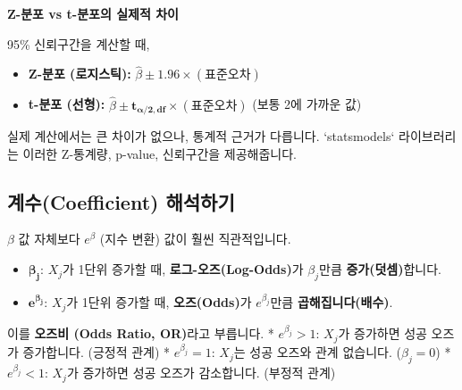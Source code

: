 \documentclass[11pt,a4paper]{book}
\theoremstyle{definition}
\begin{document}
\begin{examplebox}
  \textbf{Z-분포 vs t-분포의 실제적 차이}

  95\% 신뢰구간을 계산할 때,
  \begin{itemize}
    \item \textbf{Z-분포 (로지스틱):} $\hat{\beta} \pm \mathbf{1.96} \times (\text{표준오차})$
    \item \textbf{t-분포 (선형):} $\hat{\beta} \pm \mathbf{t_{\alpha/2, df}} \times (\text{표준오차})$ (보통 2에 가까운 값)
  \end{itemize}
  실제 계산에서는 큰 차이가 없으나, 통계적 근거가 다릅니다.
  `statsmodels` 라이브러리는 이러한 Z-통계량, p-value, 신뢰구간을 제공해줍니다.
\end{examplebox}

\subsection{계수(Coefficient) 해석하기}

$\beta$ 값 자체보다 $e^{\beta}$ (지수 변환) 값이 훨씬 직관적입니다.

\begin{itemize}
  \item $\boldsymbol{\beta_j}$: $X_j$가 1단위 증가할 때, \textbf{로그-오즈(Log-Odds)}가 $\beta_j$만큼 \textbf{증가(덧셈)}합니다.
  \item $\boldsymbol{e^{\beta_j}}$: $X_j$가 1단위 증가할 때, \textbf{오즈(Odds)}가 $e^{\beta_j}$만큼 \textbf{곱해집니다(배수)}.
\end{itemize}

이를 \textbf{오즈비 (Odds Ratio, OR)}라고 부릅니다.
* $e^{\beta_j} > 1$: $X_j$가 증가하면 성공 오즈가 증가합니다. (긍정적 관계)
* $e^{\beta_j} = 1$: $X_j$는 성공 오즈와 관계 없습니다. ($\beta_j=0$)
* $e^{\beta_j} < 1$: $X_j$가 증가하면 성공 오즈가 감소합니다. (부정적 관계)
\end{document}
